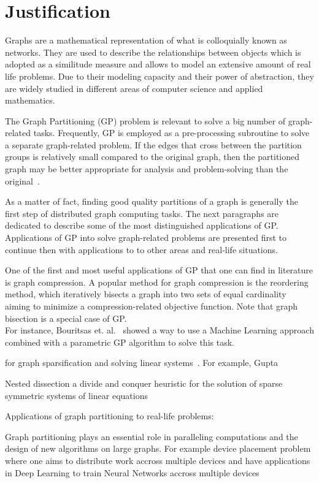\section{Justification}

Graphs are a mathematical representation of what is colloquially known as networks. They are used to describe the relationships between objects which is adopted as a similitude measure and allows to model an extensive amount of real life problems. Due to their modeling capacity and their power of abstraction, they are widely studied in different areas of computer science and applied mathematics. 

The Graph Partitioning (GP) problem is relevant to solve a big number of graph-related tasks. Frequently, GP is employed as a pre-processing subroutine to solve a separate graph-related problem. If the edges that cross between the partition groups is relatively small compared to the original graph, then the partitioned graph may be better appropriate for analysis and problem-solving than the original~\cite{bettersuited}. 

As a matter of fact, finding good quality partitions of a graph is generally the first step of distributed graph computing tasks. The next paragraphs are dedicated to describe some of the most distinguished applications of GP.
Applications of GP into solve graph-related problems are presented first to continue then with applications to to other areas and real-life situations.

One of the first and most useful applications of GP that one can find in literature is graph compression. A popular method for graph compression is the reordering method, which iteratively bisects a graph into two sets of equal cardinality aiming to minimize a compression-related objective function. Note that graph bisection is a special case of GP.\\ For instance, Bouritsas et. al.~ \cite{compressgraphs} showed a way to use a Machine Learning approach combined with a parametric GP algorithm to solve this task.

for graph sparsification and solving linear systems~\cite{sparcification}. For example, Gupta~\cite{matrixordering}

Nested dissection a divide and conquer heuristic for the solution of sparse symmetric systems of linear equations~\cite{nesteddissection}

Applications of graph partitioning to real-life problems:

Graph partitioning plays an essential role in paralleling computations and the design of new algorithms on large graphs. For example device placement problem where one aims to distribute work accross multiple devices and have applications in Deep Learning to train Neural Networks accross multiple devices \cite{deviceplacement} 

